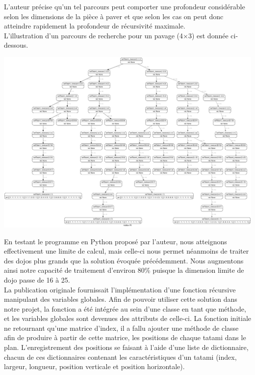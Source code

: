 L’auteur précise qu’un tel parcours peut comporter une profondeur considérable selon les dimensions de la pièce
à paver et que selon les cas on peut donc atteindre rapidement la profondeur de récursivité maximale.\\

L'illustration d'un parcours de recherche pour un pavage (4$\times$3) est donnée ci-dessous.\\

\begin{adjustwidth}{-1.5cm}{0cm}
    \includegraphics[width=19cm]{images/arbre4x3.pdf}
\end{adjustwidth}


En testant le programme en Python proposé par l’auteur, nous atteignons effectivement une limite de calcul,
mais celle-ci nous permet néanmoins de traiter des dojos plus grands que la solution évoquée précédemment.
Nous augmentons ainsi notre capacité de traitement d’environ 80\% puisque la dimension limite de dojo passe de 16 à 25.\\

La publication originale fournissait l’implémentation d’une fonction récursive manipulant des variables globales.
Afin de pouvoir utiliser cette solution dans notre projet, la fonction a été intégrée au sein d’une classe en tant que méthode,
et les variables globales sont devenues des attributs de celle-ci. La fonction initiale ne retournant qu’une matrice d’index,
il a fallu ajouter une méthode de classe afin de produire à partir de cette matrice, les positions de chaque tatami dans le plan.
L’enregistrement des positions se faisant à l’aide d’une liste de dictionnaire, chacun de ces dictionnaires contenant
les caractéristiques d’un tatami (index, largeur, longueur, position verticale et position horizontale).



